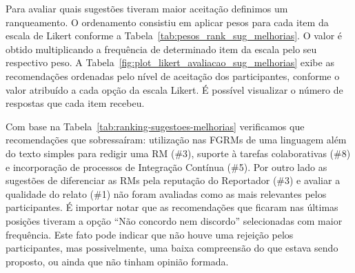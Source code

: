 Para avaliar quais sugestões tiveram maior aceitação definimos um ranqueamento.
O ordenamento consistiu em aplicar pesos para cada item da escala de Likert
conforme a Tabela~\ref{tab:pesos_rank_sug_melhorias}. O valor é obtido
multiplicando a frequência de determinado item da escala pelo seu respectivo
peso. A Tabela~\ref{fig:plot_likert_avaliacao_sug_melhorias} exibe as
recomendações ordenadas pelo nível de aceitação dos participantes, conforme o
valor atribuído a cada opção da escala Likert. É possível visualizar o número
de respostas que cada item recebeu.

\begin{table}[htpb]
\centering
{}
\caption{Pesos utilizados para ordenar as sugestões propostas.}
\label{tab:pesos_rank_sug_melhorias}
\end{table}

Com base na Tabela~\ref{tab:ranking-sugestoes-melhorias} verificamos que
recomendações que sobressaíram: utilização nas FGRMs de uma linguagem além do
texto simples para redigir uma RM (\#3), suporte à tarefas colaborativas (\#8)
e incorporação de processos de Integração Contínua (\#5). Por outro lado as
sugestões de diferenciar as RMs pela reputação do Reportador (\#3) e avaliar a
qualidade do relato (\#1) não foram avaliadas como as mais relevantes pelos
participantes. É importar notar que as recomendações que ficaram nas últimas
posições tiveram a opção ``Não concordo nem discordo'' selecionadas com maior
frequência. Este fato pode indicar que não houve uma rejeição pelos
participantes, mas possivelmente, uma baixa compreensão do que estava sendo
proposto, ou ainda que não tinham opinião formada.

